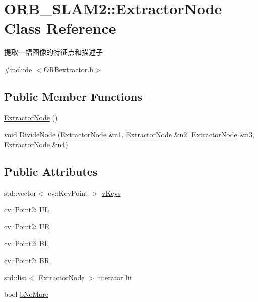 \hypertarget{class_o_r_b___s_l_a_m2_1_1_extractor_node}{}\section{O\+R\+B\+\_\+\+S\+L\+A\+M2\+:\+:Extractor\+Node Class Reference}
\label{class_o_r_b___s_l_a_m2_1_1_extractor_node}


提取一幅图像的特征点和描述子  




{\ttfamily \#include $<$O\+R\+Bextractor.\+h$>$}

\subsection*{Public Member Functions}
\begin{DoxyCompactItemize}
\item 
\mbox{\hyperlink{class_o_r_b___s_l_a_m2_1_1_extractor_node_af1920a7d5f8166debdd4a7fe4a15a8e9}{Extractor\+Node}} ()
\item 
void \mbox{\hyperlink{class_o_r_b___s_l_a_m2_1_1_extractor_node_ad560af26a7bab99551eab2e5c08f6535}{Divide\+Node}} (\mbox{\hyperlink{class_o_r_b___s_l_a_m2_1_1_extractor_node}{Extractor\+Node}} \&n1, \mbox{\hyperlink{class_o_r_b___s_l_a_m2_1_1_extractor_node}{Extractor\+Node}} \&n2, \mbox{\hyperlink{class_o_r_b___s_l_a_m2_1_1_extractor_node}{Extractor\+Node}} \&n3, \mbox{\hyperlink{class_o_r_b___s_l_a_m2_1_1_extractor_node}{Extractor\+Node}} \&n4)
\end{DoxyCompactItemize}
\subsection*{Public Attributes}
\begin{DoxyCompactItemize}
\item 
std\+::vector$<$ cv\+::\+Key\+Point $>$ \mbox{\hyperlink{class_o_r_b___s_l_a_m2_1_1_extractor_node_a34dda34415caa0e996148e53f8b174ce}{v\+Keys}}
\item 
cv\+::\+Point2i \mbox{\hyperlink{class_o_r_b___s_l_a_m2_1_1_extractor_node_a3f3ae5685a8a2b2cd42fbd08e7563c3d}{UL}}
\item 
cv\+::\+Point2i \mbox{\hyperlink{class_o_r_b___s_l_a_m2_1_1_extractor_node_a73ec9b10c8a3f98ed70a117086bae12a}{UR}}
\item 
cv\+::\+Point2i \mbox{\hyperlink{class_o_r_b___s_l_a_m2_1_1_extractor_node_ab31adc0d00b85307ba98b2ff434c30fc}{BL}}
\item 
cv\+::\+Point2i \mbox{\hyperlink{class_o_r_b___s_l_a_m2_1_1_extractor_node_a8530a1f5934122f24382859c156a441d}{BR}}
\item 
std\+::list$<$ \mbox{\hyperlink{class_o_r_b___s_l_a_m2_1_1_extractor_node}{Extractor\+Node}} $>$\+::iterator \mbox{\hyperlink{class_o_r_b___s_l_a_m2_1_1_extractor_node_a5301b76ea0e33bb066a46776810d742c}{lit}}
\item 
bool \mbox{\hyperlink{class_o_r_b___s_l_a_m2_1_1_extractor_node_ada60a6ca3a5874204dcb3245ac7d2d97}{b\+No\+More}}
\end{DoxyCompactItemize}


